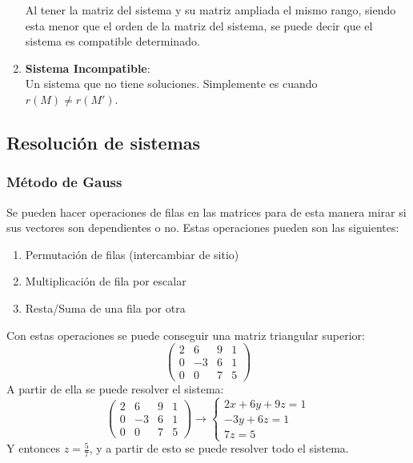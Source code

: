\documentclass[arial,a4paper,print]{article}
\begin{document}
\begin{enumerate}
Al tener la matriz del sistema y su matriz ampliada el mismo rango, siendo esta menor que el orden de la matriz del sistema, se puede decir que el sistema es compatible determinado. 

	\item \textbf{Sistema Incompatible}:\\
Un sistema que no tiene soluciones. Simplemente es cuando $r(M) \neq r(M')$. 
\end{enumerate}

\subsection{Resolución de sistemas}
\subsubsection{Método de Gauss}

Se pueden hacer operaciones de filas en las matrices para de esta manera mirar si sus vectores son dependientes o no. Estas operaciones pueden son las siguientes:
\begin{enumerate}
	\item Permutación de filas (intercambiar de sitio)
	\item Multiplicación de fila por escalar 
	\item Resta/Suma de una fila por otra 
\end{enumerate}

Con estas operaciones se puede conseguir una matriz triangular superior:
\begin{equation*}
	\left(\begin{array}{lcl|c}
		2 & 6 & 9 & 1 \\ 
		0 & -3 & 6 & 1\\ 
		0 & 0 & 7 & 5
	\end{array}\right)
\end{equation*}
A partir de ella se puede resolver el sistema:
\begin{equation*}
	\left(\begin{array}{lcl|c}
		2 & 6 & 9 & 1 \\ 
		0 & -3 & 6 & 1\\ 
		0 & 0 & 7 & 5
	\end{array}\right) \rightarrow \begin{cases}
	2x + 6y + 9z = 1 \\
	-3y + 6z = 1 \\
	7z= 5
\end{cases}
\end{equation*}
 Y entonces $z = \frac57$, y a partir de esto se puede resolver todo el sistema. 
\end{document}
